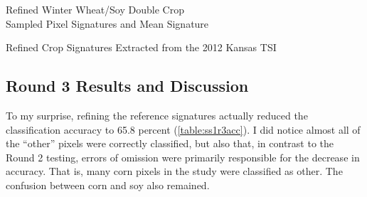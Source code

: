 \begin{ssfigure}
  \centering
  
  \caption[Refined Winter Wheat/Soy Double Crop Sampled Pixel Signatures and Mean Signature]{Refined Winter Wheat/Soy Double Crop\\Sampled Pixel Signatures and Mean Signature}
    \label{fig:KSwheatsoyrefinedsigs}
\end{ssfigure}

\begin{ssfigure}
  \centering
  
  \caption{Refined Crop Signatures Extracted from the 2012 Kansas TSI}
  \label{fig:KSenvisigs}
\end{ssfigure}

\clearpage

\subsection*{Round 3 Results and Discussion}
\label{appendix:testing:r3:results}


To my surprise, refining the reference signatures actually reduced the classification accuracy to 65.8 percent (\autoref{table:ss1r3acc}). I did notice almost all of the ``other'' pixels were correctly classified, but also that, in contrast to the Round 2 testing, errors of omission were primarily responsible for the decrease in accuracy. That is, many corn pixels in the study were classified as other. The confusion between corn and soy also remained.

